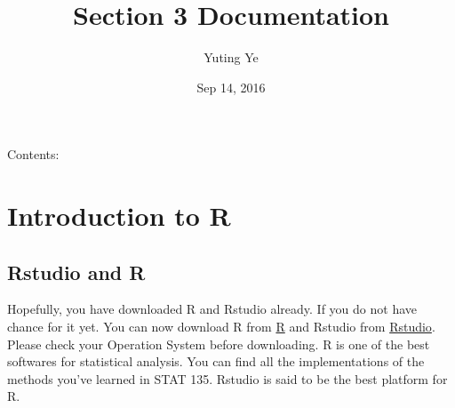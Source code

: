 \documentclass[letterpaper,10pt,english]{sphinxmanual}
\title{Section 3 Documentation}
\date{Sep 14, 2016}
\author{Yuting Ye}
\begin{document}
\maketitle
\tableofcontents
{}\label{index::doc}


Contents:


\chapter{Introduction to R}
\label{intro_R:stat135-section-3}\label{intro_R:intro-r}\label{intro_R:introduction-to-r}\label{intro_R::doc}

\section{Rstudio and R}
\label{intro_R:rstudio-and-r}\label{intro_R:install-rstudio}
Hopefully, you have downloaded R and Rstudio already. If you do not have chance
for it yet. You can now download R from \href{https://cran.rstudio.com/}{R} and
Rstudio from  \href{https://www.rstudio.com/products/rstudio/download3/}{Rstudio}.
Please check your Operation System before downloading. R is one of the best softwares
for statistical analysis. You can find all the implementations of the methods you've
learned in STAT 135. Rstudio is said to be the best platform for R.
\end{document}
